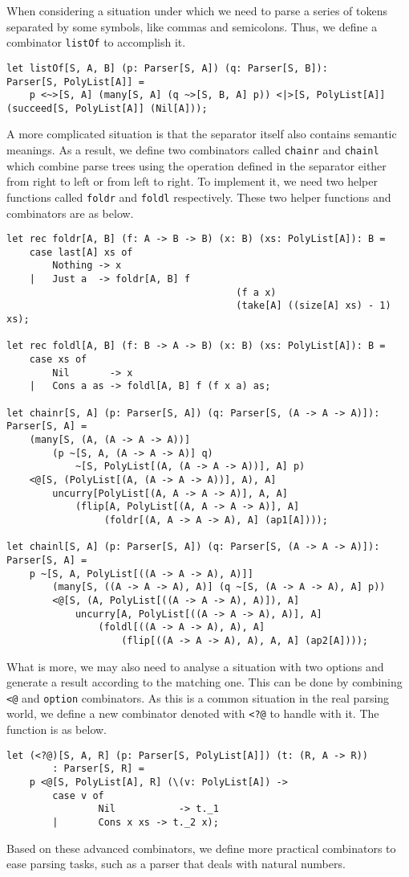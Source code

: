 When considering a situation under which we need to parse a series of tokens separated by some symbols, like commas and semicolons. Thus, we define a combinator \texttt{listOf} to accomplish it.
\begin{lstlisting}
let listOf[S, A, B] (p: Parser[S, A]) (q: Parser[S, B]): 
Parser[S, PolyList[A]] =
    p <~>[S, A] (many[S, A] (q ~>[S, B, A] p)) <|>[S, PolyList[A]] (succeed[S, PolyList[A]] (Nil[A]));
\end{lstlisting}
A more complicated situation is that the separator itself also contains semantic meanings. As a result, we define two combinators called \texttt{chainr} and \texttt{chainl} which combine parse trees using the operation defined in the separator either from right to left or from left to right. To implement it, we need two helper functions called \texttt{foldr} and \texttt{foldl} respectively. These two helper functions and combinators are as below.
\begin{lstlisting}
let rec foldr[A, B] (f: A -> B -> B) (x: B) (xs: PolyList[A]): B =
    case last[A] xs of
        Nothing -> x
    |   Just a  -> foldr[A, B] f 
                                        (f a x)
                                        (take[A] ((size[A] xs) - 1) xs);
    
let rec foldl[A, B] (f: B -> A -> B) (x: B) (xs: PolyList[A]): B =
    case xs of
        Nil       -> x
    |   Cons a as -> foldl[A, B] f (f x a) as;
    
let chainr[S, A] (p: Parser[S, A]) (q: Parser[S, (A -> A -> A)]): 
Parser[S, A] =
    (many[S, (A, (A -> A -> A))]
        (p ~[S, A, (A -> A -> A)] q) 
            ~[S, PolyList[(A, (A -> A -> A))], A] p)
    <@[S, (PolyList[(A, (A -> A -> A))], A), A] 
        uncurry[PolyList[(A, A -> A -> A)], A, A]
            (flip[A, PolyList[(A, A -> A -> A)], A]
                 (foldr[(A, A -> A -> A), A] (ap1[A])));
    
let chainl[S, A] (p: Parser[S, A]) (q: Parser[S, (A -> A -> A)]): 
Parser[S, A] =
    p ~[S, A, PolyList[((A -> A -> A), A)]]
        (many[S, ((A -> A -> A), A)] (q ~[S, (A -> A -> A), A] p))
        <@[S, (A, PolyList[((A -> A -> A), A)]), A]
            uncurry[A, PolyList[((A -> A -> A), A)], A]
                (foldl[((A -> A -> A), A), A]
                    (flip[((A -> A -> A), A), A, A] (ap2[A])));
\end{lstlisting}
What is more, we may also need to analyse a situation with two options and generate a result according to the matching one. This can be done by combining \texttt{<@} and \texttt{option} combinators. As this is a common situation in the real parsing world, we define a new combinator denoted with \texttt{<?@} to handle with it. The function is as below.
\begin{lstlisting}
let (<?@)[S, A, R] (p: Parser[S, PolyList[A]]) (t: (R, A -> R))
        : Parser[S, R] =
    p <@[S, PolyList[A], R] (\(v: PolyList[A]) ->
        case v of
                Nil           -> t._1
        |       Cons x xs -> t._2 x);
\end{lstlisting}
Based on these advanced combinators, we define more practical combinators to ease parsing tasks, such as a parser that deals with natural numbers.

